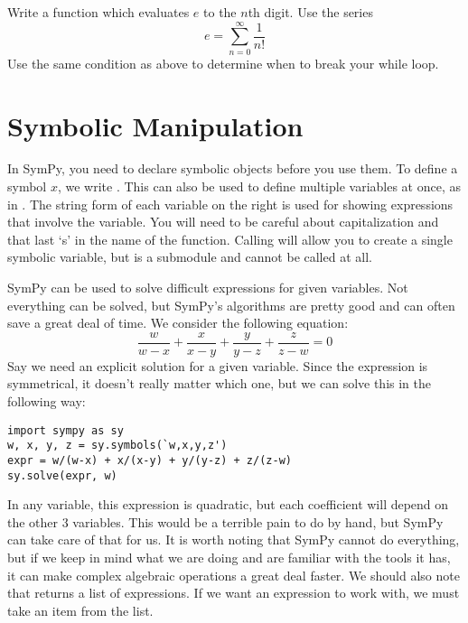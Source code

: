 \begin{problem}
Write a function which evaluates $e$ to the $n$th digit.
Use the series 
\begin{equation*}
e=\sum_{n=0}^{\infty} \frac{1}{n!}
\end{equation*}
Use the same condition as above to determine when to break your while loop.
\end{problem}

\section*{Symbolic Manipulation}
In SymPy, you need to declare symbolic objects before you use them.
To define a symbol $x$, we write .
This can also be used to define multiple variables at once, as in .
The string form of each variable on the right is used for showing expressions that involve the variable.
You will need to be careful about capitalization and that last `s' in the name of the function.
Calling  will allow you to create a single symbolic variable, but  is a submodule and cannot be called at all.

SymPy can be used to solve difficult expressions for given variables.
Not everything can be solved, but SymPy's algorithms are pretty good and can often save a great deal of time.
We consider the following equation:
\begin{equation*}
\frac{w}{w-x}+\frac{x}{x-y}+\frac{y}{y-z}+\frac{z}{z-w}=0
\end{equation*}
Say we need an explicit solution for a given variable. 
Since the expression is symmetrical, it doesn't really matter which one, but we can solve this in the following way:
\begin{lstlisting}
import sympy as sy
w, x, y, z = sy.symbols(`w,x,y,z')
expr = w/(w-x) + x/(x-y) + y/(y-z) + z/(z-w)
sy.solve(expr, w)
\end{lstlisting}
In any variable, this expression is quadratic, but each coefficient will depend on the other 3 variables.
This would be a terrible pain to do by hand, but SymPy can take care of that for us.
It is worth noting that SymPy cannot do everything, but if we keep in mind what we are doing and are familiar with the tools it has, it can make complex algebraic operations a great deal faster. 
We should also note that  returns a list of expressions.
If we want an expression to work with, we must take an item from the list.


